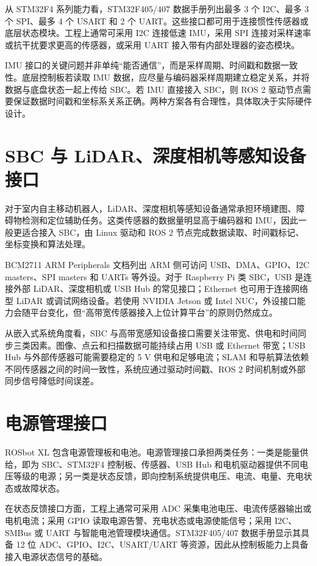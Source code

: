 \documentclass[UTF8,a4paper,12pt]{ctexrep}
\begin{document}
从 STM32F4 系列能力看，STM32F405/407 数据手册列出最多 3 个 I2C、最多 3 个 SPI、最多 4 个 USART 和 2 个 UART。这些接口都可用于连接惯性传感器或底层状态模块。工程上通常可采用 I2C 连接低速 IMU，采用 SPI 连接对采样速率或抗干扰要求更高的传感器，或采用 UART 接入带有内部处理器的姿态模块。

IMU 接口的关键问题并非单纯“能否通信”，而是采样周期、时间戳和数据一致性。底层控制板若读取 IMU 数据，应尽量与编码器采样周期建立稳定关系，并将数据与底盘状态一起上传给 SBC。若 IMU 直接接入 SBC，则 ROS 2 驱动节点需要保证数据时间戳和坐标系关系正确。两种方案各有合理性，具体取决于实际硬件设计。

\section{SBC 与 LiDAR、深度相机等感知设备接口}

对于室内自主移动机器人，LiDAR、深度相机等感知设备通常承担环境建图、障碍物检测和定位辅助任务。这类传感器的数据量明显高于编码器和 IMU，因此一般更适合接入 SBC，由 Linux 驱动和 ROS 2 节点完成数据读取、时间戳标记、坐标变换和算法处理。

BCM2711 ARM Peripherals 文档列出 ARM 侧可访问 USB、DMA、GPIO、I2C masters、SPI masters 和 UARTs 等外设。对于 Raspberry Pi 类 SBC，USB 是连接外部 LiDAR、深度相机或 USB Hub 的常见接口；Ethernet 也可用于连接网络型 LiDAR 或调试网络设备。若使用 NVIDIA Jetson 或 Intel NUC，外设接口能力会随平台变化，但“高带宽传感器接入上位计算平台”的原则仍然成立。

从嵌入式系统角度看，SBC 与高带宽感知设备接口需要关注带宽、供电和时间同步三类因素。图像、点云和扫描数据可能持续占用 USB 或 Ethernet 带宽；USB Hub 与外部传感器可能需要稳定的 5 V 供电和足够电流；SLAM 和导航算法依赖不同传感器之间的时间一致性，系统应通过驱动时间戳、ROS 2 时间机制或外部同步信号降低时间误差。

\section{电源管理接口}

ROSbot XL 包含电源管理板和电池。电源管理接口承担两类任务：一类是能量供给，即为 SBC、STM32F4 控制板、传感器、USB Hub 和电机驱动器提供不同电压等级的电源；另一类是状态反馈，即向控制系统提供电压、电流、电量、充电状态或故障状态。

在状态反馈接口方面，工程上通常可采用 ADC 采集电池电压、电流传感器输出或电机电流；采用 GPIO 读取电源告警、充电状态或电源使能信号；采用 I2C、SMBus 或 UART 与智能电池管理模块通信。STM32F405/407 数据手册显示其具备 12 位 ADC、GPIO、I2C、USART/UART 等资源，因此从控制板能力上具备接入电源状态信号的基础。
\end{document}
